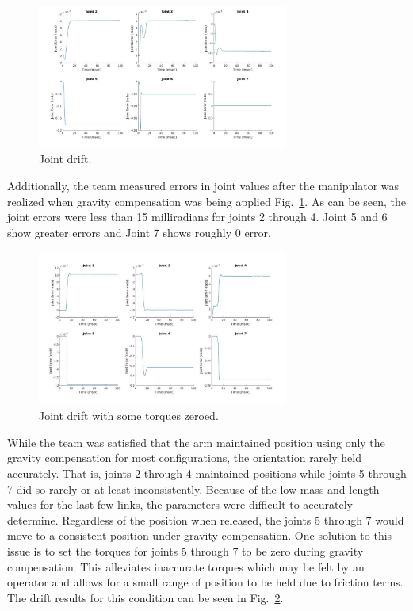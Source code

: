 \documentclass[conference]{IEEEtran}
\begin{document}
\begin{figure}[!t]
\centering
\includegraphics[width=3.25in]{result1}
\caption{Joint drift.}
\label{result12}
\end{figure}


Additionally, the team measured errors in joint values after the manipulator was realized when gravity compensation was being applied Fig.~\ref{result12}. As can be seen, the joint errors were less than 15 milliradians for joints 2 through 4. Joint 5 and 6 show greater errors and Joint 7 shows roughly 0 error.

\begin{figure}[!t]
\centering
\includegraphics[width=3.25in]{result2}
\caption{Joint drift with some torques zeroed.}
\label{result2}
\end{figure}

While the team was satisfied that the arm maintained position using only the gravity compensation for most configurations, the orientation rarely held accurately. That is, joints 2 through 4 maintained positions while joints 5 through 7 did so rarely or at least inconsistently. Because of the low mass and length values for the last few links, the parameters were difficult to accurately determine. Regardless of the position when released, the joints 5 through 7 would move to a consistent position under gravity compensation. One solution to this issue is to set the torques for joints 5 through 7 to be zero during gravity compensation. This alleviates inaccurate torques which may be felt by an operator and allows for a small range of position to be held due to friction terms. The drift results for this condition can be seen in Fig.~\ref{result2}.
\end{document}
